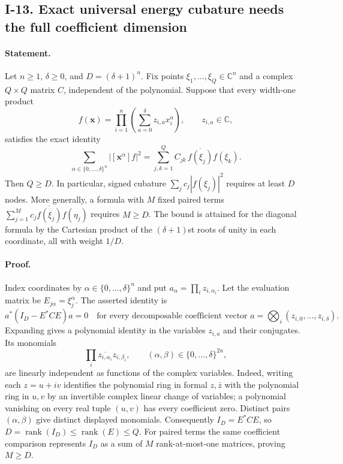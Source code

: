 \documentclass[11pt,a4paper]{article}
\theoremstyle{definition}\newtheorem{definition}{Definition}
\begin{document}
\subsection{I-13. Exact universal energy cubature needs the full coefficient dimension}
\label{I-13}

\paragraph{Statement.}
Let $n\ge1$, $\delta\ge0$, and $D=(\delta+1)^n$.  Fix points
$\xi_1,\ldots,\xi_Q\in\mathbb C^n$ and a complex $Q\times Q$ matrix $C$,
independent of the polynomial.  Suppose that every width-one product
\[
 f(\mathbf x)=\prod_{i=1}^n\left(\sum_{a=0}^{\delta}z_{i,a}x_i^a\right),
 \qquad z_{i,a}\in\mathbb C,
\]
satisfies the exact identity
\[
 \sum_{\alpha\in\{0,\ldots,\delta\}^n}|[\mathbf x^\alpha]f|^2
  =\sum_{j,k=1}^Q C_{jk}\,\overline{f(\xi_j)}f(\xi_k).
\tag{I.13}\label{eq:I-cubature}
\]
Then $Q\ge D$.  In particular, signed cubature
$\sum_j c_j|f(\xi_j)|^2$ requires at least $D$ nodes.  More generally,
a formula with $M$ fixed paired terms
$\sum_{j=1}^M c_j\overline{f(\xi_j)}f(\eta_j)$ requires $M\ge D$.
The bound is attained for the diagonal formula by the Cartesian product
of the $(\delta+1)$st roots of unity in each coordinate, all with weight
$1/D$.

\paragraph{Proof.}
Index coordinates by $\alpha\in\{0,\ldots,\delta\}^n$ and put
$a_\alpha=\prod_i z_{i,\alpha_i}$.  Let the evaluation matrix be
$E_{j\alpha}=\xi_j^\alpha$.  The asserted identity is
\[
 a^*(I_D-E^*CE)a=0
\quad\text{for every decomposable coefficient vector }
a=\bigotimes_i(z_{i,0},\ldots,z_{i,\delta}).
\]
Expanding gives a polynomial identity in the variables
$z_{i,a}$ and their conjugates.  Its monomials
\[
 \prod_i\overline{z_{i,\alpha_i}}z_{i,\beta_i},
 \qquad (\alpha,\beta)\in\{0,\ldots,\delta\}^{2n},
\]
are linearly independent as functions of the complex variables.
Indeed, writing each $z=u+iv$ identifies the polynomial ring in
formal $z,\bar z$ with the polynomial ring in $u,v$ by an invertible
complex linear change of variables; a polynomial vanishing on every
real tuple $(u,v)$ has every coefficient zero.  Distinct pairs
$(\alpha,\beta)$ give distinct displayed monomials.  Consequently
$I_D=E^*CE$, so
$D=\operatorname{rank}(I_D)\le\operatorname{rank}(E)\le Q$.
For paired terms the same coefficient comparison represents $I_D$
as a sum of $M$ rank-at-most-one matrices, proving $M\ge D$.
\end{document}
